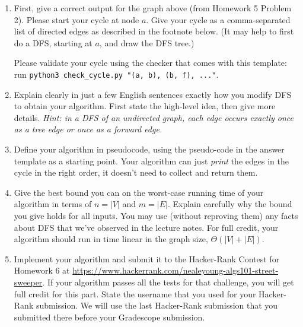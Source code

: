 \documentclass[11pt]{article}
\begin{document}
\begin{enumerate}[label=(\alph*)]
\item First, give a correct output for the graph above (from Homework 5 Problem 2).
  Please start your cycle at node $a$.  Give your cycle as a comma-separated
  list of directed edges as described in the footnote below.
  (It may help to first do a DFS, starting at $a$, and draw the DFS tree.)

  Please validate your cycle using the checker that comes with this template:\\
  run \texttt{python3 check\_cycle.py "(a, b), (b, f), ..."}.

\item 
  Explain clearly in just a few English sentences exactly how
  you modify DFS to obtain your algorithm.
  First state the high-level idea, then give more details.
  \emph{Hint: in a DFS of an undirected graph, each edge occurs
  exactly once as a tree edge or once as a forward edge.}

\item Define your algorithm in pseudocode, using the pseudo-code 
  in the answer template as a starting point.
  Your algorithm can just \emph{print} the edges in the cycle in the right order,
  it doesn't need to collect and return them.



\item Give the best bound you can on the worst-case running time of your algorithm in terms of $n=|V|$ and $m=|E|$.
  Explain carefully why the bound you give holds for all inputs.
  You may use (without reproving them) any facts about DFS that we've observed in the lecture notes.
  For full credit, your algorithm should run in time linear in the graph size, $\Theta(|V|+|E|)$.
  
\item
  Implement your algorithm and submit it to the Hacker-Rank Contest for Homework 6 at
  \url{https://www.hackerrank.com/nealeyoung-algs101-street-sweeper}.
  If your algorithm passes all the tests for that challenge, you will get full credit for this part.
  State the username that you used for your Hacker-Rank submission.
  \ifGradescope We will use the last Hacker-Rank submission that you submitted there before your Gradescope submission.\fi


\end{enumerate}
\end{document}
